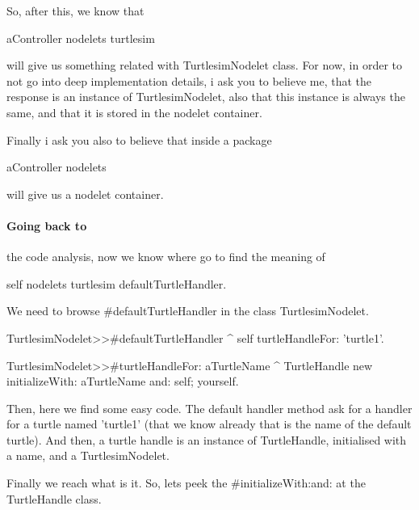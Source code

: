 \documentclass[a4paper,10pt,twoside]{book}
\begin{document}
			So, after this, we know that  
			
			\begin{code}
				aController nodelets turtlesim 
			\end{code} 
			
			will give us something related with TurtlesimNodelet class. For now, in order to not go into deep implementation details, i ask you to believe me, that the response is an instance of TurtlesimNodelet, also that this instance is always the same, and that it is stored in the nodelet container. 
			
			
			Finally i ask you also to believe that inside a package
			
			\begin{code} 
				aController nodelets 
			\end{code} 
			
			will give us a nodelet container. 
			
			
			\paragraph{Going back to} the code analysis, now we know where go to find the meaning of 
			
			\begin{code}
self nodelets turtlesim defaultTurtleHandler. 
			\end{code}
			
			We need to browse  \#defaultTurtleHandler in the class TurtlesimNodelet.

			\begin{code}
TurtlesimNodelet>>#defaultTurtleHandler
	^ self turtleHandleFor: 'turtle1'.
	
TurtlesimNodelet>>#turtleHandleFor: aTurtleName
	^ TurtleHandle new initializeWith: aTurtleName and: self; yourself.

			\end{code}
			
			
			Then, here we find some easy code. The default handler method ask for a handler for a turtle named 'turtle1' (that we know already that is the name of the default turtle).
			And then, a turtle handle is an instance of TurtleHandle, initialised with a name, and a TurtlesimNodelet.
			
			Finally we reach what is it. So, lets peek the \#initializeWith:and: at the TurtleHandle class.
			
\end{document}
